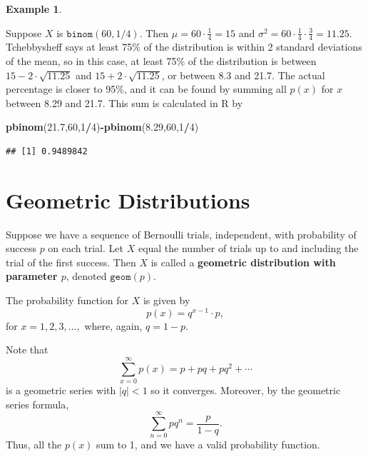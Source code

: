 \documentclass[
]{book}
\newenvironment{Shaded}{\begin{snugshade}}{\end{snugshade}}
\newcommand{\DecValTok}[1]{\textcolor[rgb]{0.00,0.00,0.81}{#1}}
\newcommand{\FloatTok}[1]{\textcolor[rgb]{0.00,0.00,0.81}{#1}}
\newcommand{\FunctionTok}[1]{\textcolor[rgb]{0.13,0.29,0.53}{\textbf{#1}}}
\newcommand{\NormalTok}[1]{#1}
\newcommand{\SpecialCharTok}[1]{\textcolor[rgb]{0.81,0.36,0.00}{\textbf{#1}}}
\theoremstyle{definition}
\theoremstyle{definition}
\newtheorem{example}{Example}[chapter]
\theoremstyle{definition}
\theoremstyle{definition}
\theoremstyle{remark}
\begin{document}
\begin{example}
\protect\hypertarget{exm:binomial-tchebby}{}\label{exm:binomial-tchebby}

Suppose \(X\) is \(\texttt{binom}(60,1/4)\). Then \(\mu = 60\cdot\frac{1}{4} = 15\) and \(\sigma^2 = 60\cdot \frac{1}{4} \cdot \frac{3}{4} = 11.25.\)
Tchebbysheff says at least 75\% of the distribution is within 2 standard deviations of the mean, so in this case, at least 75\% of the distribution is between \(15 - 2\cdot \sqrt{11.25}\) and \(15 + 2\cdot \sqrt{11.25}\), or between 8.3 and 21.7. The actual percentage is closer to 95\%, and it can be found by summing all \(p(x)\) for \(x\) between 8.29 and 21.7. This sum is calculated in R by

\begin{Shaded}
\begin{Highlighting}[]
\FunctionTok{pbinom}\NormalTok{(}\FloatTok{21.7}\NormalTok{,}\DecValTok{60}\NormalTok{,}\DecValTok{1}\SpecialCharTok{/}\DecValTok{4}\NormalTok{)}\SpecialCharTok{{-}}\FunctionTok{pbinom}\NormalTok{(}\FloatTok{8.29}\NormalTok{,}\DecValTok{60}\NormalTok{,}\DecValTok{1}\SpecialCharTok{/}\DecValTok{4}\NormalTok{)}
\end{Highlighting}
\end{Shaded}

\begin{verbatim}
## [1] 0.9489842
\end{verbatim}

\end{example}

\section{Geometric Distributions}\label{geometric}

Suppose we have a sequence of Bernoulli trials, independent, with probability of success \(p\) on each trial. Let \(X\) equal the number of trials up to and including the trial of the first success. Then \(X\) is called a \textbf{geometric distribution with parameter \(p\)}, denoted \(\texttt{geom}(p)\).

The probability function for \(X\) is given by \[p(x) = q^{x-1}\cdot p,\] for \(x = 1, 2, 3, \ldots,\) where, again, \(q = 1-p\).

Note that \[\sum_{x=0}^\infty p(x) = p + pq + pq^2 + \cdots\] is a geometric series with \(|q| < 1\) so it converges. Moreover, by the geometric series formula, \[\sum_{n=0}^\infty pq^n = \frac{p}{1-q}.\]
Thus, all the \(p(x)\) sum to 1, and we have a valid probability function.
\end{document}
